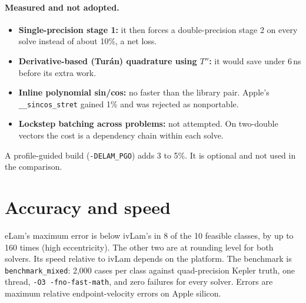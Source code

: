 \documentclass[11pt]{article}
\newcommand{\code}[1]{\texttt{#1}}
\begin{document}
\paragraph{Measured and not adopted.}
\begin{itemize}
  \item \textbf{Single-precision stage 1:} it then forces a double-precision stage 2 on every solve instead of about 10\%, a net loss.
  \item \textbf{Derivative-based (Tur\'an) quadrature using $T''$:} it would save under 6\,ns before its extra work.
  \item \textbf{Inline polynomial sin/cos:} no faster than the library pair. Apple's \code{\_\_sincos\_stret} gained 1\% and was rejected as nonportable.
  \item \textbf{Lockstep batching across problems:} not attempted. On two-double vectors the cost is a dependency chain within each solve.
\end{itemize}
A profile-guided build (\code{-DELAM\_PGO}) adds 3 to 5\%. It is optional and not used in the comparison.

\section{Accuracy and speed}

eLam's maximum error is below ivLam's in 8 of the 10 feasible classes, by up to 160 times (high eccentricity). The other two are at rounding level for both solvers. Its speed relative to ivLam depends on the platform. The benchmark is \code{benchmark\_mixed}: 2,000 cases per class against quad-precision Kepler truth, one thread, \code{-O3 -fno-fast-math}, and zero failures for every solver. Errors are maximum relative endpoint-velocity errors on Apple silicon.
\end{document}
